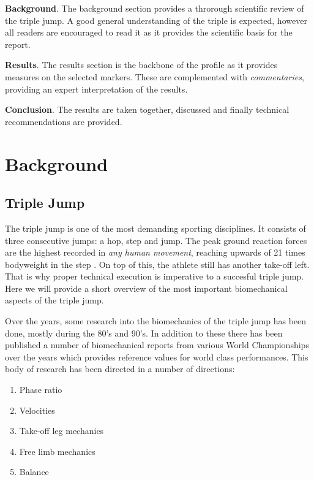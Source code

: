 \documentclass[]{scrreprt}
\providecommand{\tightlist}{%
  \setlength{\itemsep}{0pt}\setlength{\parskip}{0pt}}
\begin{document}
\textbf{Background}. The background section provides a throrough scientific review of the triple jump. A good general understanding of the triple is expected, however all readers are encouraged to read it as it provides the scientific basis for the report.

\textbf{Results}. The results section is the backbone of the profile as it provides measures on the selected markers. These are complemented with \emph{commentaries}, providing an expert interpretation of the results.

\textbf{Conclusion}. The results are taken together, discussed and finally technical recommendations are provided.

\hypertarget{part-background}{%
\part{Background}\label{part-background}}

\hypertarget{triple-jump}{%
\chapter{Triple Jump}\label{triple-jump}}

The triple jump is one of the most demanding sporting disciplines. It consists of three consecutive jumps: a hop, step and jump. The peak ground reaction forces are the highest recorded in \emph{any human movement}, reaching upwards of 21 times bodyweight in the step \autocite{Hay1993}. On top of this, the athlete still has another take-off left. That is why proper technical execution is imperative to a succesful triple jump. Here we will provide a short overview of the most important biomechanical aspects of the triple jump.

Over the years, some research into the biomechanics of the triple jump has been done, mostly during the 80's and 90's. In addition to these there has been published a number of biomechanical reports from various World Championships over the years \autocites{Hommel2009}{Bae2011}{Tucker2017}{Tucker2019} which provides reference values for world class performances. This body of research has been directed in a number of directions:

\begin{enumerate}
\def\labelenumi{\arabic{enumi}.}
\tightlist
\item
  Phase ratio \autocites{Allen2013}{Allen2016a}{Hay1999}{Yu1996}{Hay1992}
\item
  Velocities \autocites{Bayraktar2017}{Liu2015}{Fukashiro1981}
\item
  Take-off leg mechanics \autocites{Perttunen2000}{Ramey1985}{Hay1993}{Fukashiro1981}{Dziewiecki2013}{Dziewiecki2014}
\item
  Free limb mechanics \autocites{Yu1998}{Allen2010}
\item
  Balance
\end{enumerate}
\end{document}
